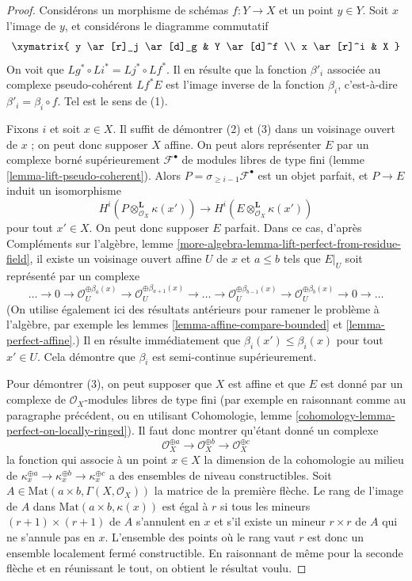 \begin{proof}
Considérons un morphisme de schémas $f : Y \to X$ et un point $y \in Y$.
Soit $x$ l'image de $y$, et considérons le diagramme commutatif
$$
\xymatrix{
y \ar[r]_j \ar[d]_g & Y \ar[d]^f \\
x \ar[r]^i & X
}
$$
On voit que $Lg^* \circ Li^* = Lj^* \circ Lf^*$. Il en résulte que
la fonction $\beta'_i$ associée au complexe pseudo-cohérent $Lf^*E$
est l'image inverse de la fonction $\beta_i$, c'est-à-dire
$\beta'_i = \beta_i \circ f$. Tel est le sens de (1).

\medskip\noindent
Fixons $i$ et soit $x \in X$. Il suffit de démontrer (2) et (3)
dans un voisinage ouvert de $x$ ; on peut donc supposer $X$ affine.
On peut alors représenter $E$ par un complexe borné supérieurement $\mathcal{F}^\bullet$
de modules libres de type fini (lemme \ref{lemma-lift-pseudo-coherent}).
Alors $P = \sigma_{\geq i - 1}\mathcal{F}^\bullet$ est un objet parfait,
et $P \to E$ induit un isomorphisme
$$
H^i(P \otimes_{\mathcal{O}_X}^\mathbf{L} \kappa(x')) \to
H^i(E \otimes_{\mathcal{O}_X}^\mathbf{L} \kappa(x'))
$$
pour tout $x' \in X$. On peut donc supposer $E$ parfait. Dans ce cas,
d'après Compléments sur l'algèbre, lemme
\ref{more-algebra-lemma-lift-perfect-from-residue-field},
il existe un voisinage ouvert affine $U$ de $x$ et
$a \leq b$ tels que $E|_U$ soit représenté par un complexe
$$
\ldots \to 0 \to \mathcal{O}_U^{\oplus \beta_a(x)}
\to \mathcal{O}_U^{\oplus \beta_{a + 1}(x)} \to
\ldots \to
\mathcal{O}_U^{\oplus \beta_{b - 1}(x)} \to
\mathcal{O}_U^{\oplus \beta_b(x)} \to 0
\to \ldots
$$
(On utilise également ici des résultats antérieurs pour ramener le problème à l'algèbre, par exemple les
lemmes \ref{lemma-affine-compare-bounded} et
\ref{lemma-perfect-affine}.)
Il en résulte immédiatement que $\beta_i(x') \leq \beta_i(x)$
pour tout $x' \in U$. Cela démontre que $\beta_i$ est semi-continue
supérieurement.

\medskip\noindent
Pour démontrer (3), on peut supposer que $X$ est affine et que
$E$ est donné par un complexe de
$\mathcal{O}_X$-modules libres de type fini (par exemple en raisonnant comme au paragraphe
précédent, ou en utilisant Cohomologie, lemme
\ref{cohomology-lemma-perfect-on-locally-ringed}).
Il faut donc montrer qu'étant donné un complexe
$$
\mathcal{O}_X^{\oplus a} \to
\mathcal{O}_X^{\oplus b} \to
\mathcal{O}_X^{\oplus c}
$$
la fonction qui associe à un point $x \in X$ la dimension de la cohomologie
au milieu de $\kappa_x^{\oplus a} \to \kappa_x^{\oplus b} \to \kappa_x^{\oplus c}$
a des ensembles de niveau constructibles. Soit
$A \in \text{Mat}(a \times b, \Gamma(X, \mathcal{O}_X))$ la matrice
de la première flèche. Le rang de l'image de $A$ dans
$\text{Mat}(a \times b, \kappa(x))$ est égal à $r$ si tous les
mineurs $(r + 1) \times (r + 1)$ de $A$ s'annulent en $x$ et s'il existe un
mineur $r \times r$ de $A$ qui ne s'annule pas en $x$. L'ensemble
des points où le rang vaut $r$ est donc un ensemble localement fermé constructible.
En raisonnant de même pour la seconde flèche et en réunissant le tout,
on obtient le résultat voulu.
\end{proof}

